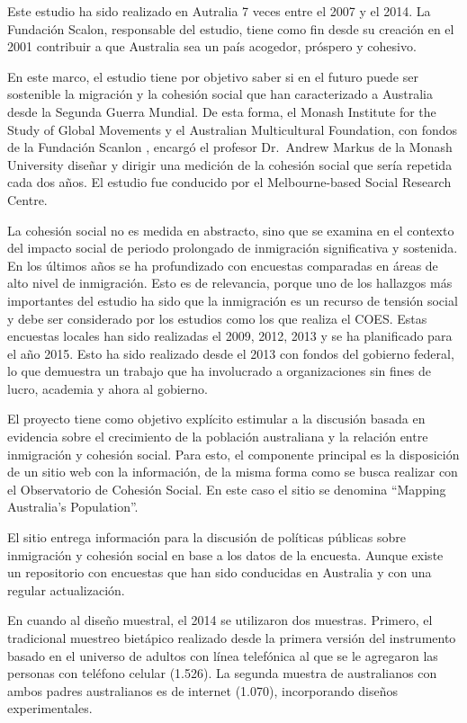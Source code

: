 \documentclass[
  12pt,
]{book}
\begin{document}
Este estudio ha sido realizado en Autralia 7 veces entre el 2007 y el
2014. La Fundación Scalon, responsable del estudio, tiene como fin desde
su creación en el 2001 contribuir a que Australia sea un país acogedor,
próspero y cohesivo.

En este marco, el estudio tiene por objetivo saber si en el futuro puede
ser sostenible la migración y la cohesión social que han caracterizado a
Australia desde la Segunda Guerra Mundial. De esta forma, el Monash
Institute for the Study of Global Movements y el Australian
Multicultural Foundation, con fondos de la Fundación Scanlon , encargó
el profesor Dr.~Andrew Markus \citep{markus_Attitudinal_2007, markus2013mapping}de la Monash University diseñar y dirigir una
medición de la cohesión social que sería repetida cada dos años. El
estudio fue conducido por el Melbourne-based Social Research Centre.

La cohesión social no es medida en abstracto, sino que se examina en el
contexto del impacto social de periodo prolongado de inmigración
significativa y sostenida. En los últimos años se ha profundizado con
encuestas comparadas en áreas de alto nivel de inmigración. Esto es de
relevancia, porque uno de los hallazgos más importantes del estudio ha
sido que la inmigración es un recurso de tensión social y debe ser
considerado por los estudios como los que realiza el COES. Estas
encuestas locales han sido realizadas el 2009, 2012, 2013 y se ha
planificado para el año 2015. Esto ha sido realizado desde el 2013 con
fondos del gobierno federal, lo que demuestra un trabajo que ha
involucrado a organizaciones sin fines de lucro, academia y ahora al
gobierno.

El proyecto tiene como objetivo explícito estimular a la discusión
basada en evidencia sobre el crecimiento de la población australiana y
la relación entre inmigración y cohesión social. Para esto, el
componente principal es la disposición de un sitio web con la
información, de la misma forma como se busca realizar con el
Observatorio de Cohesión Social. En este caso el sitio se denomina
``Mapping Australia's Population''.

El sitio entrega información para la discusión de políticas públicas
sobre inmigración y cohesión social en base a los datos de la encuesta.
Aunque existe un repositorio con encuestas que han sido conducidas en
Australia y con una regular actualización.

En cuando al diseño muestral, el 2014 se utilizaron dos muestras.
Primero, el tradicional muestreo bietápico realizado desde la primera
versión del instrumento basado en el universo de adultos con línea
telefónica al que se le agregaron las personas con teléfono celular
(1.526). La segunda muestra de australianos con ambos padres
australianos es de internet (1.070), incorporando diseños
experimentales.
\end{document}

